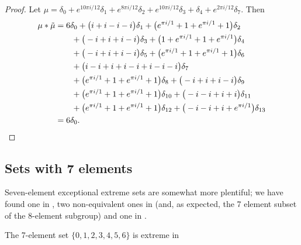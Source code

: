 \begin{proof}
Let
$ \mu =\delta_{0}  +   e^{ 10\pi i  / 12}\delta_{1}  +   e^{ 8\pi i  / 12}\delta_{2}  +   e^{ 10\pi i  / 12}\delta_{3}  +  \delta_{4}  +   e^{ 2\pi i  / 12}\delta_{7}
.$
  Then
\begin{align*}
\mu * \tilde \mu &= 6\delta_{0}   +  \big(  i +  i - i- i\big)\delta_{1} 
  +  \big( e^{\pi i / 1}+ 1+ e^{\pi i / 1}+ 1\big)\delta_{2} 
\\& \qquad +  \big( -i +  i +  i - i\big)\delta_{3} 
  +  \big( 1+ e^{\pi i / 1}+ 1+ e^{\pi i / 1}\big)\delta_{4} 
\\& \qquad +  \big( -i +  i +  i - i\big)\delta_{5} 
  +  \big( e^{\pi i / 1}+ 1+ e^{\pi i / 1}+ 1\big)\delta_{6} 
\\& \qquad +  \big(  i - i+  i +  i - i+  i - i- i\big)\delta_{7} 
\\& \qquad +  \big( e^{\pi i / 1}+ 1+ e^{\pi i / 1}+ 1\big)\delta_{8} 
  +  \big( -i +  i +  i - i\big)\delta_{9} 
  \\&\qquad  +  \big( e^{\pi i / 1}+ 1+ e^{\pi i / 1}+ 1\big)\delta_{10} 
  +  \big( -i - i+  i +  i \big)\delta_{11} 
\\& \qquad
  +  \big( e^{\pi i / 1}+ 1+ e^{\pi i / 1}+ 1\big)\delta_{12} 
  +  \big( -i - i+  i + e^{\pi i / 1}\big)\delta_{13} 
  \\& = 6\delta_0.\qedhere
\end{align*}
\end{proof}

\subsection{Sets with 7 elements}\label{subsec7elts}
Seven-element exceptional extreme sets are somewhat more plentiful; we have
found one in , two non-equivalent ones in  (and, as expected, the 7 element subset of the 8-element subgroup)
and one in .

\begin{prop}\label{prop7in8} The 7-element set 
$\{0,1,2,3,4,5,6\}$ is extreme in 
\end{prop}

